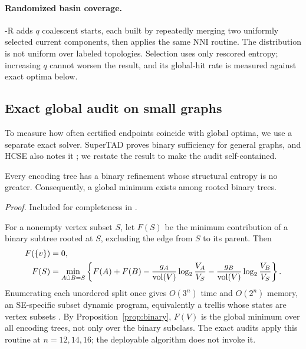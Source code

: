 \paragraph{Randomized basin coverage.}
\NEST-R adds $q$ coalescent starts, each built by repeatedly merging two
uniformly selected current components, then applies the same NNI routine. The
distribution is not uniform over labeled topologies. Selection uses only
rescored entropy; increasing $q$ cannot worsen the result, and its global-hit
rate is measured against exact optima below.

\subsection{Exact global audit on small graphs}
To measure how often certified endpoints coincide with global optima, we use a
separate exact solver. SuperTAD proves binary sufficiency for general graphs,
and HCSE also notes it \cite{zhang2021supertad,pan2025}; we restate the result
to make the audit self-contained.

\begin{proposition}\label{prop:binary}
Every encoding tree has a binary refinement whose structural entropy is no
greater. Consequently, a global minimum exists among rooted binary trees.
\end{proposition}
\emph{Proof.} Included for completeness in \proofdetails.

For a nonempty vertex subset $S$, let $F(S)$ be the minimum contribution of a
binary subtree rooted at $S$, excluding the edge from $S$ to its parent. Then
\begin{equation}
\begin{split}
F(\{v\})&=0,\\
F(S)&=\min_{A\dot\cup B=S}\left\{F(A)+F(B)
-\frac{g_A}{\operatorname{vol}(V)}\log_2\frac{V_A}{V_S}
-\frac{g_B}{\operatorname{vol}(V)}\log_2\frac{V_B}{V_S}\right\}.
\end{split}\label{eq:exact-dp}
\end{equation}
Enumerating each unordered split once gives $O(3^n)$ time and $O(2^n)$ memory,
an SE-specific subset dynamic program, equivalently a trellis whose states are
vertex subsets \cite{macaluso2021}.
By Proposition~\ref{prop:binary}, $F(V)$ is the global minimum over all encoding
trees, not only over the binary subclass. The exact audits apply this routine at
$n=12,14,16$; the deployable \NEST algorithm does not invoke it.

